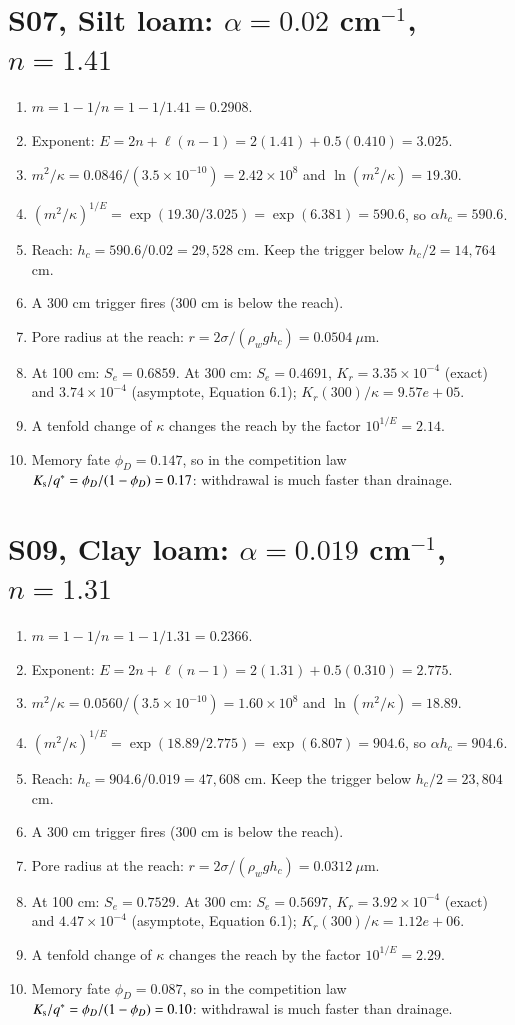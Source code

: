 \section{S07, Silt loam: $\alpha=0.02$ cm$^{-1}$, $n=1.41$}
\begin{enumerate}[leftmargin=*,itemsep=1pt]
\item $m=1-1/n=1-1/1.41=0.2908$.
\item Exponent: $E=2n+\ell(n-1)=2(1.41)+0.5(0.410)=3.025$.
\item $m^2/\kappa=0.0846/(3.5\times10^{-10})=2.42\times10^{8}$ and $\ln(m^2/\kappa)=19.30$.
\item $(m^2/\kappa)^{1/E}=\exp(19.30/3.025)=\exp(6.381)=590.6$, so $\alpha h_c=590.6$.
\item Reach: $h_c=590.6/0.02=29,528$ cm. Keep the trigger below $h_c/2=14,764$ cm.
\item A 300 cm trigger fires (300 cm is below the reach).
\item Pore radius at the reach: $r=2\sigma/(\rho_wgh_c)=0.0504\ \mu$m.
\item At 100 cm: $S_e=0.6859$. At 300 cm: $S_e=0.4691$, $K_r=3.35\times10^{-4}$ (exact) and $3.74\times10^{-4}$ (asymptote, Equation 6.1); $K_r(300)/\kappa=9.57e+05$.
\item A tenfold change of $\kappa$ changes the reach by the factor $10^{1/E}=2.14$.
\item Memory fate $\phi_D=0.147$, so in the competition law $K_{\mathrm s}/q^*=\phi_D/(1-\phi_D)=0.17$: withdrawal is much faster than drainage.
\end{enumerate}
\section{S09, Clay loam: $\alpha=0.019$ cm$^{-1}$, $n=1.31$}
\begin{enumerate}[leftmargin=*,itemsep=1pt]
\item $m=1-1/n=1-1/1.31=0.2366$.
\item Exponent: $E=2n+\ell(n-1)=2(1.31)+0.5(0.310)=2.775$.
\item $m^2/\kappa=0.0560/(3.5\times10^{-10})=1.60\times10^{8}$ and $\ln(m^2/\kappa)=18.89$.
\item $(m^2/\kappa)^{1/E}=\exp(18.89/2.775)=\exp(6.807)=904.6$, so $\alpha h_c=904.6$.
\item Reach: $h_c=904.6/0.019=47,608$ cm. Keep the trigger below $h_c/2=23,804$ cm.
\item A 300 cm trigger fires (300 cm is below the reach).
\item Pore radius at the reach: $r=2\sigma/(\rho_wgh_c)=0.0312\ \mu$m.
\item At 100 cm: $S_e=0.7529$. At 300 cm: $S_e=0.5697$, $K_r=3.92\times10^{-4}$ (exact) and $4.47\times10^{-4}$ (asymptote, Equation 6.1); $K_r(300)/\kappa=1.12e+06$.
\item A tenfold change of $\kappa$ changes the reach by the factor $10^{1/E}=2.29$.
\item Memory fate $\phi_D=0.087$, so in the competition law $K_{\mathrm s}/q^*=\phi_D/(1-\phi_D)=0.10$: withdrawal is much faster than drainage.
\end{enumerate}
